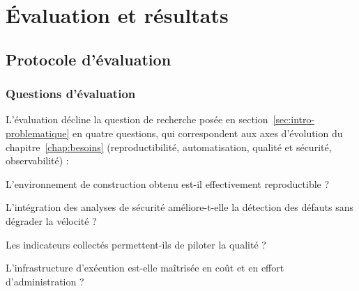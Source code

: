 %
\chapter{Évaluation et résultats}
\label{chap:evaluation}

\section{Protocole d'évaluation}
\label{sec:eval-protocole}

\subsection{Questions d'évaluation}
L'évaluation décline la question de recherche posée en
section~\ref{sec:intro-problematique} en quatre questions, qui correspondent
aux axes d'évolution du chapitre~\ref{chap:besoins} (reproductibilité,
automatisation, qualité et sécurité, observabilité) :

\begin{description}[style=nextline,leftmargin=1.5cm]
  \item[QE1] L'environnement de construction obtenu est-il effectivement
    reproductible ?
  \item[QE2] L'intégration des analyses de sécurité améliore-t-elle la
    détection des défauts sans dégrader la vélocité ?
  \item[QE3] Les indicateurs collectés permettent-ils de piloter la qualité ?
  \item[QE4] L'infrastructure d'exécution est-elle maîtrisée en coût et en
    effort d'administration ?
\end{description}

